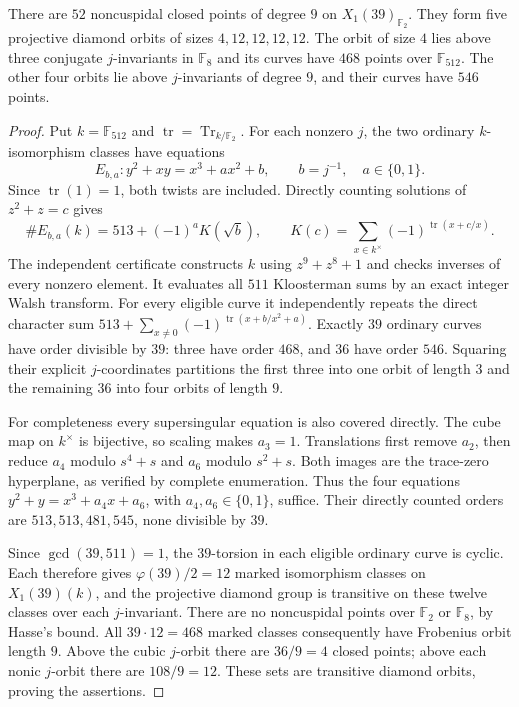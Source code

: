 \begin{lemma}\label{lem:nonic39-independent-F512-census}
There are $52$ noncuspidal closed points of degree $9$ on
$X_1(39)_{\mathbb F_2}$. They form five projective diamond orbits
of sizes $4,12,12,12,12$. The orbit of size $4$ lies above three
conjugate $j$-invariants in $\mathbb F_8$ and its curves have
$468$ points over $\mathbb F_{512}$. The other four orbits lie above
$j$-invariants of degree $9$, and their curves have $546$ points.
\end{lemma}
\begin{proof}
Put $k=\mathbb F_{512}$ and $\operatorname{tr}=\operatorname{Tr}_{k/\mathbb F_2}$.
For each nonzero $j$, the two ordinary $k$-isomorphism classes have equations
\[
 E_{b,a}:y^2+xy=x^3+ax^2+b,\qquad b=j^{-1},\quad a\in\{0,1\}.
\]
Since $\operatorname{tr}(1)=1$, both twists are included. Directly counting
solutions of $z^2+z=c$ gives
\[
 \#E_{b,a}(k)=513+(-1)^a K(\sqrt b),\qquad
 K(c)=\sum_{x\in k^\times}(-1)^{\operatorname{tr}(x+c/x)}.
\]
The independent certificate constructs $k$ using $z^9+z^8+1$ and
checks inverses of every nonzero element. It evaluates all $511$
Kloosterman sums by an exact integer Walsh transform. For every eligible
curve it independently repeats the direct character sum
$513+\sum_{x\ne0}(-1)^{\operatorname{tr}(x+b/x^2+a)}$.
Exactly $39$ ordinary curves have order divisible by $39$:
three have order $468$, and $36$ have order $546$.
Squaring their explicit $j$-coordinates partitions the first three into
one orbit of length $3$ and the remaining $36$ into four orbits of length $9$.

For completeness every supersingular equation is also covered directly.
The cube map on $k^\times$ is bijective, so scaling makes $a_3=1$.
Translations first remove $a_2$, then reduce $a_4$ modulo
$s^4+s$ and $a_6$ modulo $s^2+s$. Both images are the trace-zero
hyperplane, as verified by complete enumeration.
Thus the four equations $y^2+y=x^3+a_4x+a_6$, with
$a_4,a_6\in\{0,1\}$, suffice. Their directly counted orders are
$513,513,481,545$, none divisible by $39$.

Since $\gcd(39,511)=1$, the $39$-torsion in each eligible ordinary
curve is cyclic. Each therefore gives $\varphi(39)/2=12$ marked
isomorphism classes on $X_1(39)(k)$, and the projective diamond group
is transitive on these twelve classes over each $j$-invariant.
There are no noncuspidal points over $\mathbb F_2$ or $\mathbb F_8$,
by Hasse's bound. All $39\cdot12=468$ marked classes consequently
have Frobenius orbit length $9$.
Above the cubic $j$-orbit there are $36/9=4$ closed points; above
each nonic $j$-orbit there are $108/9=12$.
These sets are transitive diamond orbits, proving the assertions.
\end{proof}
